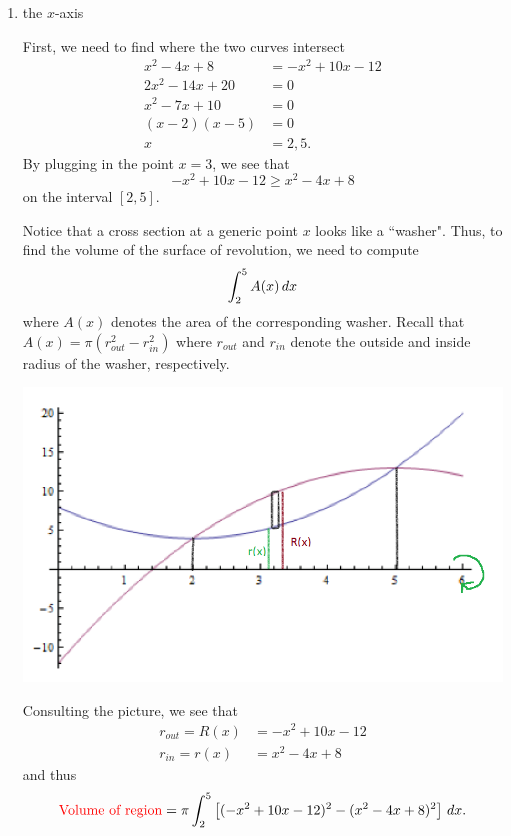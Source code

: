 \documentclass[noinstructornotes]{ximera}
\begin{document}
\begin{problem}
	\begin{enumerate}
		\item  the $x$-axis
		\begin{freeResponse}
		First, we need to find where the two curves intersect
			\begin{align*}
			x^2-4x+8 &= -x^2+10x-12  \\
			2x^2 -14x +20 &= 0  \\
			x^2 - 7x + 10 &= 0  \\
			(x-2)(x-5) &= 0  \\
			x &= 2,5.
			\end{align*}
		By plugging in the point $x=3$, we see that
			\[
			-x^2+10x-12 \geq x^2-4x+8
			\]
		on the interval $[2,5]$.  
		
		
		
		Notice that a cross section at a generic point $x$ looks like a ``washer".  
		Thus, to find the volume of the surface of revolution, we need to compute
			\[
			\int_2^5 A(x) \,d x
			\]
		where $A(x)$ denotes the area of the corresponding washer.  
		Recall that $A(x) = \pi \left( r_{out}^2 - r_{in}^2 \right)$ where $r_{out}$ and $r_{in}$ denote the outside and inside radius of the washer, respectively.  
		
			\begin{image}
		\includegraphics[scale=0.8]{Figure6-3-3new.png}
		\end{image}
		
		Consulting the picture, we see that
			\begin{align*}
			r_{out} = R(x) &= -x^2+10x-12  \\
			r_{in} = r(x) &= x^2-4x+8
			\end{align*}
		and thus
			\[
			\text{{\color{red} Volume of region}} = \pi \int_2^5 \left[ (-x^2+10x-12)^2 - (x^2-4x+8)^2 \right] \,d x.
			\]
			

\end{freeResponse}
\end{enumerate}
\end{problem}
\end{document}
